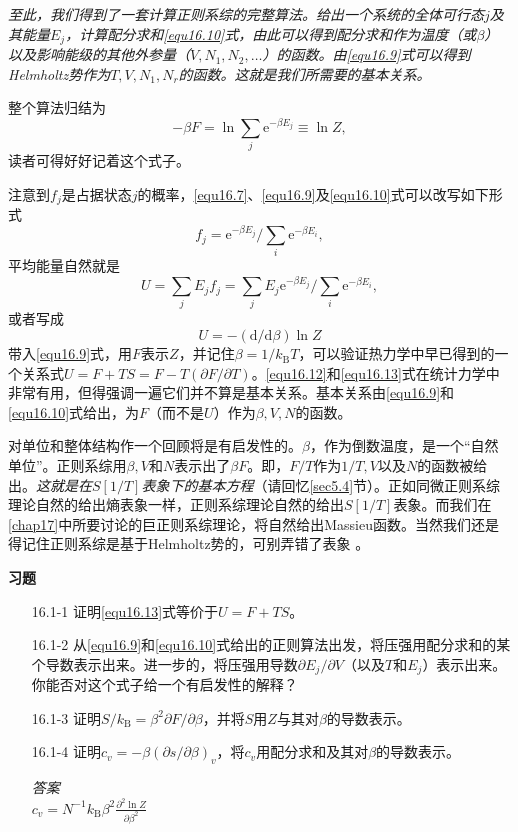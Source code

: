 {\it 至此，我们得到了一套计算正则系综的完整算法。给出一个系统的全体可行态$j$及其能量$E_j$，计算配分求和\ref{equ16.10}式，由此可以得到配分求和作为温度（或$\beta$）以及影响能级的其他外参量（$V,N_1,N_2,\dots$）的函数。由\eqref{equ16.9}式可以得到Helmholtz势作为$T,V,N_1,N_r$的函数。这就是我们所需要的基本关系。}

整个算法归结为
\begin{equation}
-\beta F = \ln \sum\limits_j \mathrm e^{-\beta E_j} \equiv \ln Z,
\end{equation}
读者可得好好记着这个式子。

注意到$f_j$是占据状态$j$的概率，\eqref{equ16.7}、\eqref{equ16.9}及\eqref{equ16.10}式可以改写如下形式
\begin{equation}
f_j  = {\mathrm e}^{-\beta E_j}/\sum\limits_i \mathrm e^{-\beta E_i},
\end{equation}
平均能量自然就是
\begin{equation}
U = \sum\limits_j E_jf_j = \sum\limits_j E_j{\mathrm e}^{-\beta E_j}/\sum\limits_i \mathrm e^{-\beta E_i},
\label{equ16.12}
\end{equation}
或者写成
\begin{equation}
U = -(\mathrm d/\mathrm d\beta)\ln Z
\label{equ16.13}
\end{equation}
带入\eqref{equ16.9}式，用$F$表示$Z$，并记住$\beta = 1/k_\text{B}T$，可以验证热力学中早已得到的一个关系式$U=F+TS=F-T(\partial F/\partial T)$。\eqref{equ16.12}和\eqref{equ16.13}式在统计力学中非常有用，但得强调一遍它们并不算是基本关系。基本关系由\eqref{equ16.9}和\eqref{equ16.10}式给出，为$F$（而不是$U$）作为$\beta,V,N$的函数。

对单位和整体结构作一个回顾将是有启发性的。$\beta$，作为倒数温度，是一个“自然单位”。正则系综用$\beta,V$和$N$表示出了$\beta F$。即，$F/T$作为$1/T,V$以及$N$的函数被给出。{\it 这就是在$S[1/T]$表象下的基本方程}（请回忆\ref{sec5.4}节）。正如同微正则系综理论自然的给出熵表象一样，正则系综理论自然的给出$S[1/T]$表象。而我们在\ref{chap17}中所要讨论的巨正则系综理论，将自然给出Massieu函数。当然我们还是得记住正则系综是基于Helmholtz势的，可别弄错了表象%
%
。

{\noindent\bf 习题}
\begin{itemize}
\item[16.1-1] 证明\eqref{equ16.13}式等价于$U=F+TS$。
\item[16.1-2] 从\eqref{equ16.9}和\eqref{equ16.10}式给出的正则算法出发，将压强用配分求和的某个导数表示出来。进一步的，将压强用导数$\partial E_j/\partial V$（以及$T$和$E_j$）表示出来。你能否对这个式子给一个有启发性的解释？
\item[16.1-3] 证明$S/k_\text{B}=\beta^2\partial F/\partial\beta$，并将$S$用$Z$与其对$\beta$的导数表示。
\item[16.1-4] 证明$c_v=-\beta(\partial s/\partial\beta)_v$，将$c_v$用配分求和及其对$\beta$的导数表示。
\begin{flushleft}
{\it 答案}\\
$c_v=N^{-1}k_\text{B}\beta^2\frac{\partial^2\ln Z}{\partial \beta^2}$
\end{flushleft}
\end{itemize}

